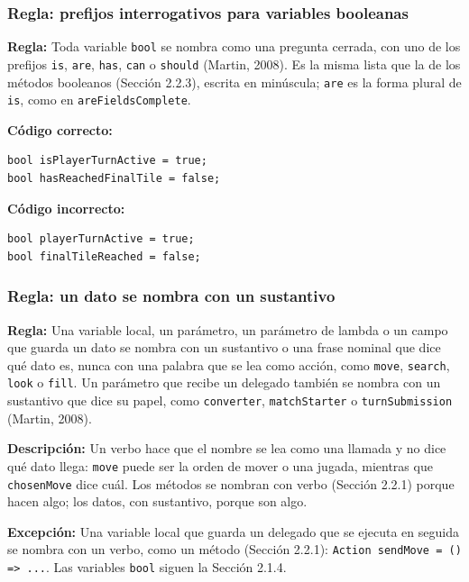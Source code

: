 \subsubsection{Regla: prefijos interrogativos para variables booleanas}

\textbf{Regla:} Toda variable \texttt{bool} se nombra como una pregunta cerrada, con uno de los prefijos \texttt{is}, \texttt{are}, \texttt{has}, \texttt{can} o \texttt{should} (Martin, 2008). Es la misma lista que la de los métodos booleanos (Sección 2.2.3), escrita en minúscula; \texttt{are} es la forma plural de \texttt{is}, como en \texttt{areFieldsComplete}.

\textbf{Código correcto:}
\begin{lstlisting}[style=csharpstyle]
bool isPlayerTurnActive = true;
bool hasReachedFinalTile = false;
\end{lstlisting}

\textbf{Código incorrecto:}
\begin{lstlisting}[style=csharpstyle]
bool playerTurnActive = true;
bool finalTileReached = false;
\end{lstlisting}

\subsubsection{Regla: un dato se nombra con un sustantivo}

\textbf{Regla:} Una variable local, un parámetro, un parámetro de lambda o un campo que guarda un dato se nombra con un sustantivo o una frase nominal que dice qué dato es, nunca con una palabra que se lea como acción, como \texttt{move}, \texttt{search}, \texttt{look} o \texttt{fill}. Un parámetro que recibe un delegado también se nombra con un sustantivo que dice su papel, como \texttt{converter}, \texttt{matchStarter} o \texttt{turnSubmission} (Martin, 2008).

\textbf{Descripción:} Un verbo hace que el nombre se lea como una llamada y no dice qué dato llega: \texttt{move} puede ser la orden de mover o una jugada, mientras que \texttt{chosenMove} dice cuál. Los métodos se nombran con verbo (Sección 2.2.1) porque hacen algo; los datos, con sustantivo, porque son algo.

\textbf{Excepción:} Una variable local que guarda un delegado que se ejecuta en seguida se nombra con un verbo, como un método (Sección 2.2.1): \mbox{\texttt{Action sendMove = () =>\ ...}}. Las variables \texttt{bool} siguen la Sección 2.1.4.

